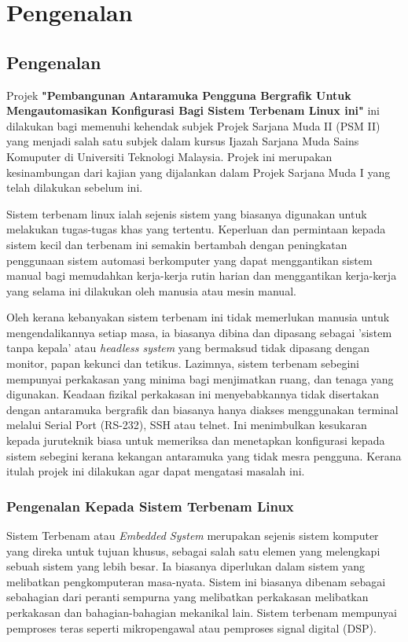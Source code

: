 \chapter{Pengenalan}\label{c1}%

\section{Pengenalan}
Projek \textbf{"Pembangunan Antaramuka Pengguna Bergrafik Untuk Mengautomasikan Konfigurasi Bagi Sistem Terbenam Linux ini"} ini dilakukan bagi memenuhi kehendak subjek Projek Sarjana Muda II (PSM II) yang menjadi salah satu subjek dalam kursus Ijazah Sarjana Muda Sains Komuputer di Universiti Teknologi Malaysia. Projek ini merupakan kesinambungan dari kajian yang dijalankan dalam Projek Sarjana Muda I yang telah dilakukan sebelum ini.

Sistem terbenam linux ialah sejenis sistem yang biasanya digunakan untuk melakukan tugas-tugas khas yang tertentu. Keperluan dan permintaan kepada sistem kecil dan terbenam ini semakin bertambah dengan peningkatan penggunaan sistem automasi berkomputer yang dapat menggantikan sistem manual bagi memudahkan kerja-kerja rutin harian dan menggantikan kerja-kerja yang selama ini dilakukan oleh manusia atau mesin manual. 

Oleh kerana kebanyakan sistem terbenam ini tidak memerlukan manusia untuk mengendalikannya setiap masa, ia biasanya dibina dan dipasang sebagai 'sistem tanpa kepala' atau \textit{headless system}\cite{w2} yang bermaksud tidak dipasang dengan monitor, papan kekunci dan tetikus. Lazimnya, sistem terbenam sebegini mempunyai perkakasan yang minima bagi menjimatkan ruang, dan tenaga yang digunakan. Keadaan fizikal perkakasan ini menyebabkannya tidak disertakan dengan antaramuka bergrafik dan biasanya hanya diakses menggunakan terminal melalui Serial Port (RS-232), SSH atau telnet. Ini menimbulkan kesukaran kepada juruteknik biasa untuk memeriksa dan menetapkan konfigurasi kepada sistem sebegini kerana kekangan antaramuka yang tidak mesra pengguna. Kerana itulah projek ini dilakukan agar dapat mengatasi masalah ini.

\subsection{Pengenalan Kepada Sistem Terbenam Linux}%
Sistem Terbenam atau \textit{Embedded System} merupakan sejenis sistem komputer yang direka untuk tujuan khusus, sebagai salah satu elemen yang melengkapi sebuah sistem yang lebih besar. Ia biasanya diperlukan dalam sistem yang melibatkan pengkomputeran masa-nyata. Sistem ini biasanya dibenam sebagai sebahagian dari peranti sempurna yang melibatkan perkakasan melibatkan perkakasan dan bahagian-bahagian mekanikal lain. Sistem terbenam mempunyai pemproses teras seperti mikropengawal atau pemproses signal digital (DSP). 

